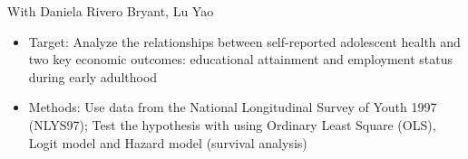 \documentclass{resume}
\begin{document}
With Daniela Rivero Bryant, Lu Yao
\begin{itemize}
  \item Target: Analyze the relationships between self-reported adolescent health and two key economic outcomes: educational attainment and employment status during early adulthood
  \item Methods: Use data from the National Longitudinal Survey of Youth 1997 (NLYS97); Test the hypothesis with using Ordinary Least Square (OLS), Logit model and Hazard model (survival analysis) 
  \end{itemize}
  



\end{document}
